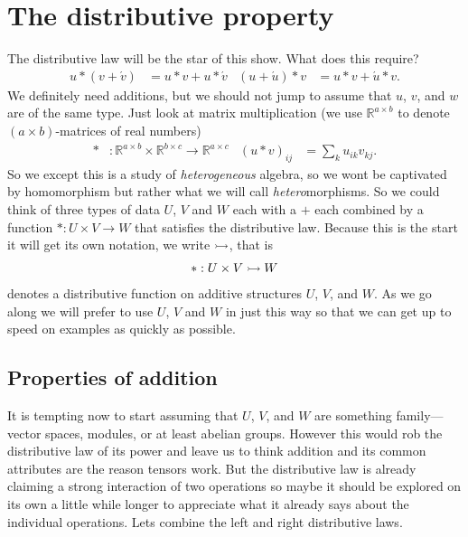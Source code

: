 
\chapter{The distributive property}

The distributive law will be the star of this show.  What does this require?
\begin{align}
    u*(v+\acute{v}) & = u*v+u*\acute{v}
    & 
    (u+\acute{u})*v & = u*v + \acute{u}*v.
\end{align}
We definitely need additions, but we should not jump to assume that $u$, $v$, and $w$ are 
of the same type.  Just look at  matrix 
multiplication (we use $\mathbb{R}^{a\times b}$ to denote $(a\times b)$-matrices 
of real numbers)
\begin{align*}
    *&:\mathbb{R}^{a\times b}\times \mathbb{R}^{b\times c}\to \mathbb{R}^{a\times c}
    &
    (u*v)_{ij} & = \sum_k u_{ik}v_{kj}.
\end{align*}
So we except this is a study of \emph{heterogeneous} algebra, so we wont be
captivated by homomorphism but rather what we will call \emph{hetero}morphisms.
So we could think of three types of data $U$, $V$ and $W$ each with a $+$ each
combined by a function 
$*:U\times V\to W$
that satisfies the distributive law.  Because this is the start it will get its own 
notation, we write $\rightarrowtail$, that is 
\begin{align*}
    *:U\times V\rightarrowtail W
\end{align*}
denotes a distributive function on additive structures $U$, $V$, and $W$.
As we go along we will prefer to use $U$, $V$ and $W$ in just this way so that 
we can get up to speed on examples as quickly as possible.


\section{Properties of addition}
It is tempting now to start  assuming that $U$, $V$, and $W$ are 
something family---vector spaces, modules, or at least abelian groups.
However this would rob the distributive law of its power and leave us to think 
addition and its common attributes are the reason tensors work.  But the 
distributive law is already claiming a strong interaction of two operations 
so maybe it should be explored on its own a little while longer to appreciate 
what it already says about the individual operations.  Lets combine the left and right 
distributive laws.

\begin{center}
\end{center}